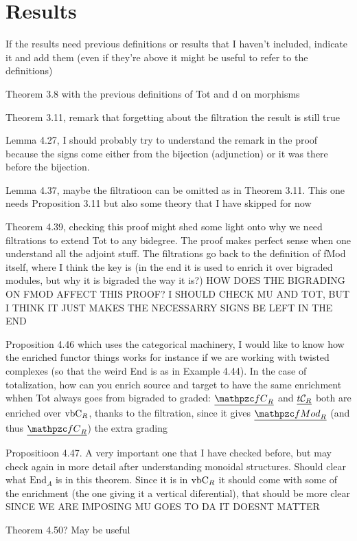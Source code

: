 \documentclass[twoside]{article}
\begin{document}
\section{Results}
If the results need previous definitions or results that I haven't included, indicate it and add them (even if they're above it might be useful to refer to the definitions)


Theorem 3.8 with the previous definitions of Tot and d on morphisms

Theorem 3.11, remark that forgetting about the filtration the result is still true

Lemma 4.27, I should probably try to understand  the remark in the proof because the signs come either from the bijection (adjunction) or it was there before the bijection.

Lemma 4.37, maybe the filtratioon can be omitted as in Theorem 3.11. This one needs Proposition 3.11 but also some theory that I have skipped for now

Theorem 4.39, checking this proof might shed some light onto why we need filtrations to extend Tot to any bidegree. The proof makes perfect sense when one understand all the adjoint stuff. The filtrations go back to the definition of fMod itself, where I think the key is (in the end it is used to enrich it over bigraded modules, but why it is bigraded the way it is?) HOW DOES THE BIGRADING ON FMOD AFFECT THIS PROOF? I SHOULD CHECK MU AND TOT, BUT I THINK IT JUST MAKES THE NECESSARRY SIGNS BE LEFT IN THE END

Proposition 4.46 which uses the categorical machinery, I would like to know how the enriched functor things works for instance if we are working with twisted complexes (so that the weird End is as in Example 4.44). In the case of totalization, how can you enrich source and target to have the same enrichment whhen Tot always goes from bigraded to graded: $\ufC$ and $\underline{t\mathcal{C}_R}$ both are enriched over $\mathrm{vbC}_R$, thanks to the filtration, since it gives $\ufMod$ (and thus $\ufC$) the extra grading

Propositioon 4.47. A very important one that I have checked before, but may check again in more detail after understanding monoidal structures. Should clear what $\mathrm{End}_A$ is in this theorem. Since it is in $\mathrm{vbC}_R$ it should come with some of the enrichment (the one giving it a vertical diferential), that should be more clear SINCE WE ARE IMPOSING MU GOES TO DA IT DOESNT MATTER

Theorem 4.50? May be useful
\end{document}
